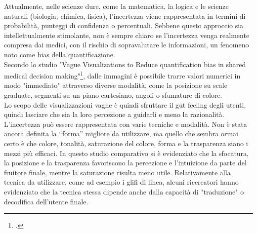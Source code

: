 Attualmente, nelle scienze dure, come la matematica, la logica e le scienze naturali (biologia, chimica, fisica), l'incertezza viene rappresentata in termini di probabilità, punteggi di confidenza o percentuali. Sebbene questo approccio sia intellettualmente stimolante, non è sempre chiaro se l'incertezza venga realmente compresa dai medici, con il rischio di sopravalutare le informazioni, un fenomeno noto come bias della quantificazione.\\
Secondo lo studio "Vague Visualizations to Reduce quantification bias in shared medical decision making"\footcite{womak:vague-visualizations-quantification-bias}, dalle immagini è possibile trarre valori numerici in modo "immediato" attraverso diverse modalità, come la posizione su scale graduate, segmenti su un piano cartesiano, angoli o sfumature di colore.\\
Lo scopo delle visualizzazioni vaghe è quindi sfruttare il gut feeling degli utenti, quindi lasciare che sia la loro percezione a guidarli e meno la razionalità.\\
L'incertezza può essere rappresentata con varie tecniche e modalità. Non è stata ancora definita la “forma” migliore da utilizzare, ma quello che sembra ormai certo è che colore, tonalità, saturazione del colore, forma e la trasparenza siano i mezzi più efficaci. In questo studio comparativo si è evidenziato che la sfocatura, la posizione e la trasparenza favoriscono la percezione e l'intuizione da parte del fruitore finale, mentre la saturazione risulta meno utile. Relativamente alla tecnica da utilizzare, come ad esempio i glifi di linea, alcuni ricercatori hanno evidenziato che la tecnica stessa dipende anche dalla capacità di "traduzione" o decodifica dell'utente finale.\\

